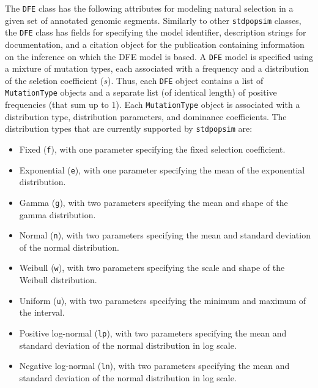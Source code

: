 \documentclass[hidelinks]{article}
\newcommand{\stdpopsim}{\texttt{stdpopsim}\xspace}
\begin{document}
    The \texttt{DFE} class 
    has the following attributes for modeling natural selection in a given set of annotated genomic segments.
    Similarly to other \stdpopsim classes, the \texttt{DFE} class has fields for specifying the model identifier, description strings for documentation,
    and a citation object for the publication containing information on the inference on which the DFE model is based.
    A \texttt{DFE} model is specified using a mixture of mutation types,
    each associated with a frequency and a distribution of the seletion coefficient ($s$).
    Thus, each \texttt{DFE} object contains a list of \texttt{MutationType} objects
    and a separate list (of identical length) of positive frequencies (that sum up to 1).
    Each \texttt{MutationType} object is associated with a distribution type, distribution parameters, and dominance coefficients.
    The distribution types that are currently supported by \stdpopsim are:
    \begin{itemize}
       \item Fixed       (\texttt{f}), with one parameter specifying the fixed selection coefficient.
       \item Exponential (\texttt{e}), with one parameter specifying the mean of the exponential distribution.
       \item Gamma       (\texttt{g}), with two parameters specifying the mean and shape of the gamma distribution.
       \item Normal      (\texttt{n}), with two parameters specifying the mean and standard deviation of the normal distribution.
       \item Weibull     (\texttt{w}), with two parameters specifying the scale and shape of the Weibull distribution.
       \item Uniform     (\texttt{u}), with two parameters specifying the minimum and maximum of the interval.
       \item Positive log-normal  (\texttt{lp}), with two parameters specifying the mean and standard deviation of the normal distribution in log scale.
       \item Negative log-normal  (\texttt{ln}), with two parameters specifying the mean and standard deviation of the normal distribution in log scale.
    \end{itemize}
    
\end{document}
